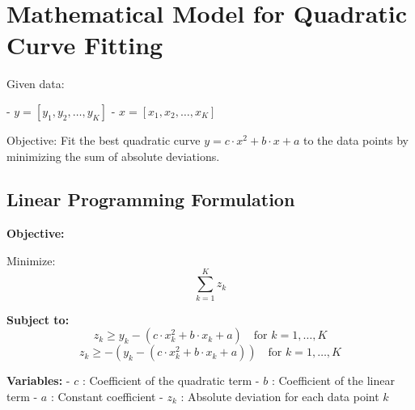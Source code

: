 \documentclass{article}
\begin{document}
\section*{Mathematical Model for Quadratic Curve Fitting}

Given data:

- \( y = [y_1, y_2, \ldots, y_K] \)
- \( x = [x_1, x_2, \ldots, x_K] \)

Objective: Fit the best quadratic curve \( y = c \cdot x^2 + b \cdot x + a \) to the data points by minimizing the sum of absolute deviations.

\subsection*{Linear Programming Formulation}

\textbf{Objective:}

Minimize:
\[
\sum_{k=1}^{K} z_k
\]

\textbf{Subject to:}
\[
z_k \geq y_k - (c \cdot x_k^2 + b \cdot x_k + a) \quad \text{for } k = 1, \ldots, K
\]
\[
z_k \geq -(y_k - (c \cdot x_k^2 + b \cdot x_k + a)) \quad \text{for } k = 1, \ldots, K
\]

\textbf{Variables:}
- \( c \) : Coefficient of the quadratic term
- \( b \) : Coefficient of the linear term
- \( a \) : Constant coefficient
- \( z_k \) : Absolute deviation for each data point \( k \)
\end{document}
